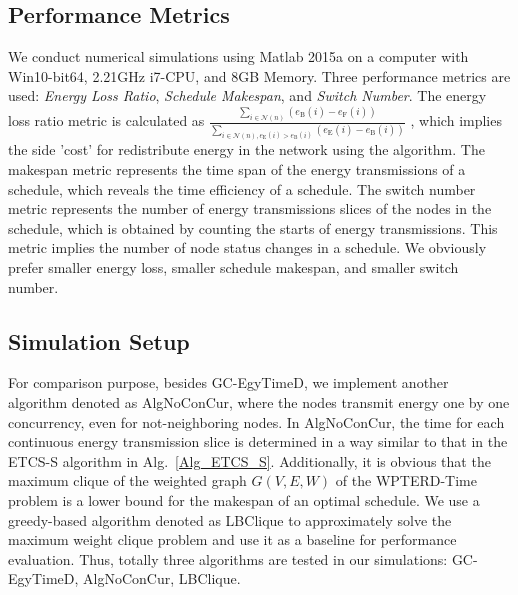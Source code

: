 \documentclass[journal,10pt]{IEEEtran}
\begin{document}
\subsection{Performance Metrics}
We conduct numerical simulations using Matlab 2015a on a computer with Win10-bit64, 2.21GHz i7-CPU, and 8GB Memory. Three performance metrics are used: \textit{Energy Loss Ratio}, \textit{Schedule Makespan}, and \textit{Switch Number}. The energy loss ratio metric is calculated as  $\frac{\sum_{i{\in}\mathcal{N}(n)}(e_\text{B}(i){-}e_\text{F}(i))}{\sum_{i{\in}\mathcal{N}(n),e_\text{E}(i){>}e_\text{B}(i)}(e_\text{E}(i){-}e_\text{B}(i))}$   , which implies the side 'cost' for redistribute energy in the network using the algorithm. The makespan metric represents the time span of the energy transmissions of a schedule, which reveals the time efficiency of a schedule. The switch number metric represents the number of energy transmissions slices of the nodes in the schedule, which is obtained by counting the starts of energy transmissions. This metric implies the number of node status changes in a schedule. We obviously prefer smaller energy loss, smaller schedule makespan, and smaller switch number.

\subsection{Simulation Setup}
For comparison purpose, besides GC-EgyTimeD, we implement another algorithm denoted as AlgNoConCur, where the nodes transmit energy one by one concurrency, even for not-neighboring nodes. In AlgNoConCur, the time for each continuous energy transmission slice is determined in a way similar to that in the ETCS-S algorithm in Alg.~\ref{Alg_ETCS_S}. Additionally, it is obvious that the maximum clique of the weighted graph $G(V,E,W)$ of the WPTERD-Time problem is a lower bound for the makespan of an optimal schedule. We use a greedy-based algorithm denoted as LBClique to approximately solve the maximum weight clique problem and use it as a baseline for performance evaluation. Thus, totally three algorithms are tested in our simulations: GC-EgyTimeD, AlgNoConCur, LBClique.
\end{document}
